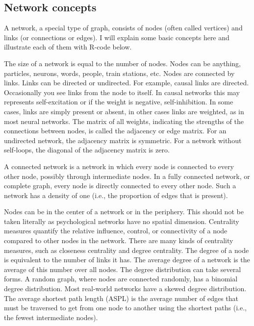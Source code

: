 \documentclass[
  a4paper,
  DIV=11,
  numbers=noendperiod,
  oneside]{scrreprt}
\begin{document}
\hypertarget{sec-Network-concepts}{%
\subsection{Network concepts}\label{sec-Network-concepts}}

A network, a special type of graph, consists of nodes (often called
vertices) and links (or connections or edges). I will explain some basic
concepts here and illustrate each of them with R-code below.

The size of a network is equal to the number of nodes. Nodes can be
anything, particles, neurons, words, people, train stations, etc. Nodes
are connected by links. Links can be directed or undirected. For
example, causal links are directed. Occasionally you see links from the
node to itself. In causal networks this may represents self-excitation
or if the weight is negative, self-inhibition. In some cases, links are
simply present or absent, in other cases links are weighted, as in most
neural networks. The matrix of all weights, indicating the strengths of
the connections between nodes, is called the adjacency or edge matrix.
For an undirected network, the adjacency matrix is symmetric. For a
network without self-loops, the diagonal of the adjacency matrix is
zero.

A connected network is a network in which every node is connected to
every other node, possibly through intermediate nodes. In a fully
connected network, or complete graph, every node is directly connected
to every other node. Such a network has a density of one (i.e., the
proportion of edges that is present).

Nodes can be in the center of a network or in the periphery. This should
not be taken literally as psychological networks have no spatial
dimension. Centrality measures quantify the relative influence, control,
or connectivity of a node compared to other nodes in the network. There
are many kinds of centrality measures, such as closeness centrality and
degree centrality. The degree of a node is equivalent to the number of
links it has. The average degree of a network is the average of this
number over all nodes. The degree distribution can take several forms. A
random graph, where nodes are connected randomly, has a binomial degree
distribution. Most real-world networks have a skewed degree
distribution. The average shortest path length (ASPL) is the average
number of edges that must be traversed to get from one node to another
using the shortest paths (i.e., the fewest intermediate nodes).
\end{document}
